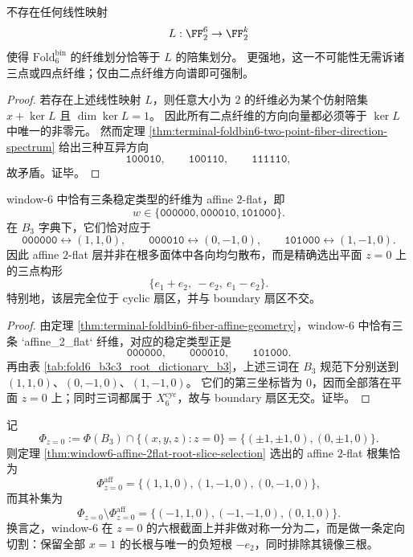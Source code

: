 \begin{theorem}[方向谱版线性核障碍]\label{thm:window6-direction-spectrum-linear-kernel-obstruction}
不存在任何线性映射
\[
L:\FF_2^6\to \FF_2^k
\]
使得 \(\mathrm{Fold}^{\mathrm{bin}}_6\) 的纤维划分恰等于 \(L\) 的陪集划分。
更强地，这一不可能性无需诉诸三点或四点纤维；仅由二点纤维方向谱即可强制。
\end{theorem}

\begin{proof}
若存在上述线性映射 \(L\)，则任意大小为 \(2\) 的纤维必为某个仿射陪集
\(
x+\ker L
\)
且 \(\dim\ker L=1\)。
因此所有二点纤维的方向向量都必须等于 \(\ker L\) 中唯一的非零元。
然而定理 \ref{thm:terminal-foldbin6-two-point-fiber-direction-spectrum} 给出三种互异方向
\[
\texttt{100010},\qquad \texttt{100110},\qquad \texttt{111110},
\]
故矛盾。证毕。
\end{proof}

\begin{theorem}\label{thm:window6-affine-2flat-root-slice-selection}
window-\(6\) 中恰有三条稳定类型的纤维为 affine \(2\)-flat，即
\[
w\in\{\texttt{000000},\texttt{000010},\texttt{101000}\}.
\]
在 \(B_3\) 字典下，它们恰对应于
\[
\texttt{000000}\leftrightarrow (1,1,0),\qquad
\texttt{000010}\leftrightarrow (0,-1,0),\qquad
\texttt{101000}\leftrightarrow (1,-1,0).
\]
因此 affine \(2\)-flat 层并非在根多面体中各向均匀散布，而是精确选出平面 \(z=0\) 上的三点构形
\[
\{e_1+e_2,\ -e_2,\ e_1-e_2\}.
\]
特别地，该层完全位于 cyclic 扇区，并与 boundary 扇区不交。
\end{theorem}

\begin{proof}
由定理 \ref{thm:terminal-foldbin6-fiber-affine-geometry}，window-\(6\) 中恰有三条 `affine_2_flat` 纤维，对应的稳定类型正是
\[
\texttt{000000},\qquad \texttt{000010},\qquad \texttt{101000}.
\]
再由表 \ref{tab:fold6_b3c3_root_dictionary_b3}，上述三词在 \(B_3\) 规范下分别送到
\((1,1,0)\)、\((0,-1,0)\)、\((1,-1,0)\)。
它们的第三坐标皆为 \(0\)，因而全部落在平面 \(z=0\) 上；同时三词都属于 \(X_6^{\mathrm{cyc}}\)，故与 boundary 扇区无交。证毕。
\end{proof}

\begin{proposition}[\(z=0\) 根截面的手征切割]\label{prop:window6-z0-root-slice-chiral-cut}
记
\[
\Phi_{z=0}:=\Phi(B_3)\cap\{(x,y,z):z=0\}
=\{(\pm1,\pm1,0),(0,\pm1,0)\}.
\]
则定理 \ref{thm:window6-affine-2flat-root-slice-selection} 选出的 affine \(2\)-flat 根集恰为
\[
\Phi_{z=0}^{\mathrm{aff}}
=\{(1,1,0),(1,-1,0),(0,-1,0)\},
\]
而其补集为
\[
\Phi_{z=0}\setminus \Phi_{z=0}^{\mathrm{aff}}
=\{(-1,1,0),(-1,-1,0),(0,1,0)\}.
\]
换言之，window-\(6\) 在 \(z=0\) 的六根截面上并非做对称一分为二，而是做一条定向切割：保留全部 \(x=1\) 的长根与唯一的负短根 \(-e_2\)，同时排除其镜像三根。
\end{proposition}


